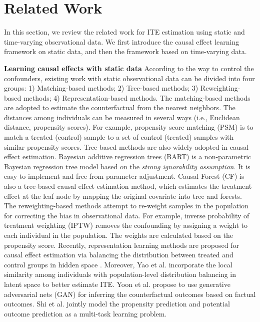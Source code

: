 \section{Related Work}
In this section, we review the related work for ITE estimation using static and time-varying observational data. We first introduce the causal effect learning framework on static data, and then the framework based on time-varying data. 

\noindent\textbf{Learning causal effects with static data} According to the way to control the confounders, existing work with static observational data can be divided into four groups: 1) Matching-based methods; 2) Tree-based methods; 3) Reweighting-based methods; 4) Representation-based methods. The matching-based methods are adopted to estimate the counterfactual from the nearest neighbors. The distances among individuals can be measured in several ways (i.e., Euclidean distance, propensity scores). For example, propensity score matching (PSM) \cite{rosenbaum1983central} is to match a treated (control) sample to a set of control (treated) samples with similar propensity scores. Tree-based methods are also widely adopted in causal effect estimation. Bayesian additive regression trees (BART) \cite{hill2011bayesian} is a non-parametric Bayesian regression tree model based on the \textit{strong ignorability assumption}. It is easy to implement and free from parameter adjustment. Causal Forest (CF) \cite{wager2018estimation} is also a tree-based causal effect estimation method, which estimates the treatment effect at the leaf node by mapping the original covariate into tree and forests. The reweighting-based methods attempt to re-weight samples in the population for correcting the bias in observational data. For example, inverse probability of treatment weighting (IPTW) \cite{rosenbaum1983central} removes the confounding by assigning a weight to each individual in the population. The weights are calculated based on the propensity score. Recently, representation learning methods are proposed for causal effect estimation via balancing the distribution between treated and control groups in hidden space \cite{johansson2016learning,shalit2017estimating}. Moreover, Yao et al. \cite{yao2018representation} incorporate the local similarity among individuals with population-level distribution balancing in latent space to better estimate ITE. Yoon et al. propose to use generative adversarial nets (GAN) for inferring the counterfactual outcomes based on factual outcomes. Shi et al. \cite{shi2019adapting} jointly model the propensity prediction and potential outcome prediction as a multi-task learning problem. 

